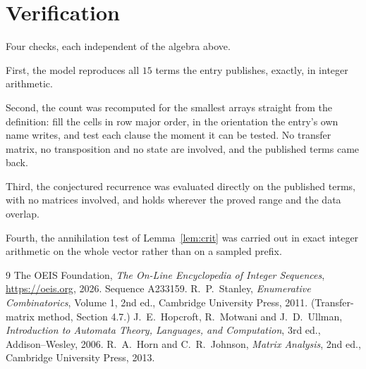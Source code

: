 \documentclass[11pt,a4paper]{article}
\theoremstyle{plain}
\theoremstyle{definition}
\begin{document}
\section{Verification}

Four checks, each independent of the algebra above.

First, the model reproduces all $15$ terms the entry publishes, exactly, in integer
arithmetic.

Second, the count was recomputed for the smallest arrays straight from the definition: fill the
cells in row major order, in the orientation the entry's own name writes, and test each clause
the moment it can be tested. No transfer matrix, no transposition and no state are involved,
and the published terms came back.

Third, the conjectured recurrence was evaluated directly on the published terms, with no
matrices involved, and holds wherever the proved range and the data overlap.

Fourth, the annihilation test of Lemma~\ref{lem:crit} was carried out in exact integer
arithmetic on the whole vector rather than on a sampled prefix.

\begin{thebibliography}{9}
 The OEIS Foundation, \emph{The On-Line Encyclopedia of Integer
Sequences}, \url{https://oeis.org}, 2026. Sequence A233159.
 R.~P.~Stanley, \emph{Enumerative Combinatorics}, Volume 1, 2nd ed.,
Cambridge University Press, 2011. (Transfer-matrix method, Section 4.7.)
 J.~E.~Hopcroft, R.~Motwani and J.~D.~Ullman, \emph{Introduction to Automata
Theory, Languages, and Computation}, 3rd ed., Addison--Wesley, 2006.
 R.~A.~Horn and C.~R.~Johnson, \emph{Matrix Analysis}, 2nd ed., Cambridge
University Press, 2013.
\end{thebibliography}
\end{document}
